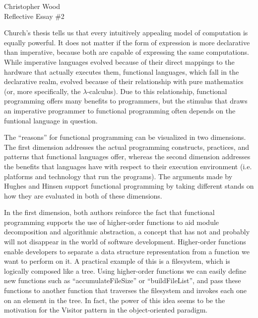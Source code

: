 \documentclass[12pt,letterpaper]{article}
\begin{document}
\begin{center}
Christopher Wood \\
Reflective Essay \#2 \\
\end{center}


Church's thesis tells us that every intuitively appealing model of computation is equally powerful. It does not 
matter if the form of expression is more declarative than imperative, because both are capable of 
expressing the same computations. While imperative languages evolved because of their direct mappings
to the hardware that actually executes them, functional languages, which fall in the declarative realm, evolved
because of their relationship with pure mathematics (or, more specifically, the $\lambda$-calculus). Due to this
relationship, functional programming offers many benefits to programmers, but the stimulus that draws an imperative programmer to functional programming often depends on the funtional language in question.

The ``reasons'' for functional programming can be visualized in two dimensions. The first dimension addresses 
the actual programming constructs, practices, and patterns that functional languages offer, whereas the second dimension addresses the 
benefits that languages have with respect to their execution environment (i.e. platforms and technology that run
the programs). The arguments made by Hughes \cite{Hughes} and Hinsen \cite{Hinsen} support functional
programming by taking different stands on how they are evaluated in both of these dimensions.

In the first dimension, 
both authors reinforce the fact that functional programming supports the use of higher-order functions to aid module
decomposition and algorithmic abstraction, a concept that has not and probably will not disappear in the world of 
software development. Higher-order functions enable developers to separate a data structure representation from a function we want to perform on it. A practical example of this is a filesystem, which is logically composed like a tree. Using higher-order functions we can easily define new functions such as ``accumulateFileSize'' or ``buildFileList'', and pass these functions to another function that traverses the filesystem and invokes each one on an element in the tree. In fact, the power of this idea seems to be the motivation for the Visitor pattern in the object-oriented paradigm. 
\end{document}
